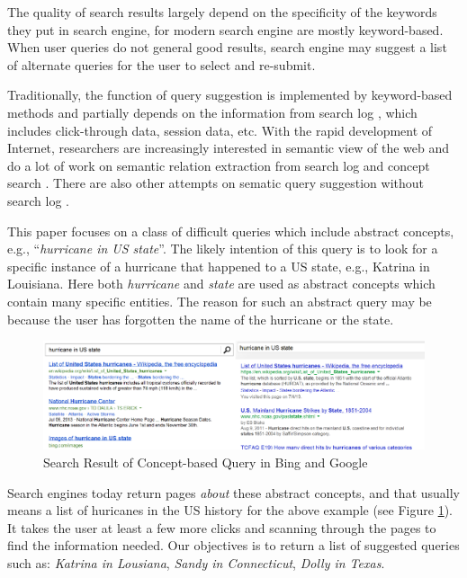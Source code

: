 The quality of search results largely depend on the specificity
of the keywords they put in search engine, for modern search engine
are mostly keyword-based. When user queries do not general good results,
search engine may suggest a list of alternate queries for the user to
select and re-submit.

Traditionally, the function of query suggestion is implemented by
keyword-based methods and partially depends on the information from
search log \cite{baeza2005query,cao2008context,dupret2005recommending,zhang2006mining}, which includes click-through data, session data, etc.
With the rapid development of Internet, researchers are increasingly
interested in semantic view of the web and do a lot of work on semantic
relation extraction from search log \cite{baeza2007extracting} and
concept search \cite{giunchiglia2008concept,wang2012concept}.
There are also other attempts on sematic query suggestion without search log \cite{BhatiaMM11}. 

This paper focuses on a class of difficult queries which include abstract
concepts, e.g., ``{\em hurricane in US state}''. The likely intention of
this query is to look for a specific instance of a hurricane that happened
to a US state, e.g., Katrina in Louisiana. Here both {\em hurricane} and
{\em state} are used as abstract concepts which contain many specific
entities. The reason for such an abstract query may be because the user
has forgotten the name of the hurricane or the state.

\begin{figure}[ht]
  \centering
  \includegraphics[width=\columnwidth]{images/hurricaneinstates}
  \caption{Search Result of Concept-based Query in Bing and Google}
  \label{fig:exampleGoogle}
\end{figure}

Search engines today return pages {\em about} these abstract concepts, and
that usually means a list of huricanes in the US history for the above
example (see Figure \ref{fig:exampleGoogle}).
It takes the user at least a few
more clicks and scanning through the pages to find the information needed.
Our objectives is to return a list of suggested queries such as:
{\em Katrina in Lousiana},
{\em Sandy in Connecticut},
{\em Dolly in Texas}.

